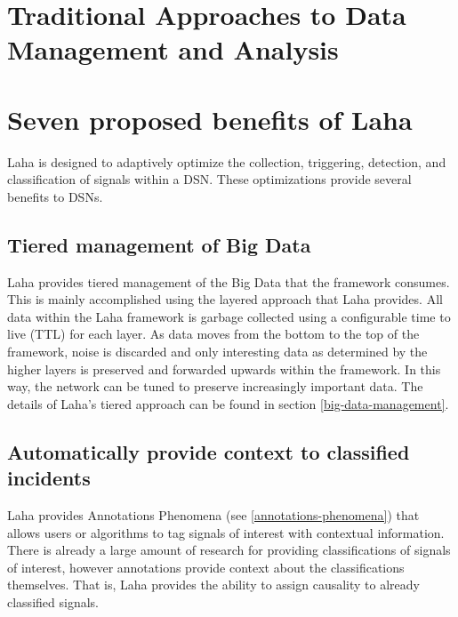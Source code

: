 \section{Traditional Approaches to Data Management and Analysis}

\section{Seven proposed benefits of Laha} \label{laha-benefits}
Laha is designed to adaptively optimize the collection, triggering, detection, and classification of signals within a DSN. These optimizations provide several benefits to DSNs.

\subsection{Tiered management of Big Data}

Laha provides tiered management of the Big Data that the framework consumes. This is mainly accomplished using the layered approach that Laha provides. All data within the Laha framework is garbage collected using a configurable time to live (TTL) for each layer. As data moves from the bottom to the top of the framework, noise is discarded and only interesting data as determined by the higher layers is preserved and forwarded upwards within the framework. In this way, the network can be tuned to preserve increasingly important data. The details of Laha's tiered approach can be found in section \ref{big-data-management}.

\subsection{Automatically provide context to classified incidents}
Laha provides Annotations Phenomena (see \ref{annotations-phenomena}) that allows users or algorithms to tag signals of interest with contextual information. There is already a large amount of research for providing classifications of signals of interest, however annotations provide context about the classifications themselves. That is, Laha provides the ability to assign causality to already classified signals.

